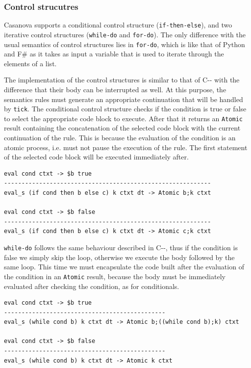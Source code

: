 \subsubsection{Control strucutres}
Casanova supports a conditional control structure (\texttt{if-then-else}), and two iterative control structures (\texttt{while-do} and \texttt{for-do}). The only difference with the usual semantics of control structures lies in \texttt{for-do}, which is like that of Python and F\# as it takes as input a variable that is used to iterate through the elements of a list.

The implementation of the control structures is similar to that of C-{}- with the difference that their body can be interrupted as well. At this purpose, the semantics rules must generate an appropriate continuation that will be handled by \texttt{tick}. The conditional control structure checks if the condition is true or false to select the appropriate code block to execute. After that it returns an \texttt{Atomic} result containing the concatenation of the selected code block with the current continuation of the rule. This is because the evaluation of the condition is an atomic process, i.e. must not pause the execution of the rule. The first statement of the selected code block will be executed immediately after.

\begin{lstlisting}
eval cond ctxt -> $b true
-----------------------------------------------------------
eval_s (if cond then b else c) k ctxt dt -> Atomic b;k ctxt

eval cond ctxt -> $b false
-----------------------------------------------------------
eval_s (if cond then b else c) k ctxt dt -> Atomic c;k ctxt
\end{lstlisting}

\noindent
\texttt{while-do} follows the same behaviour described in C-{}-, thus if the condition is false we simply skip the loop, otherwise we execute the body followed by the same loop. This time we must encapsulate the code built after the evaluation of the condition in an \texttt{Atomic} result, because the body must be immediately evaluated after checking the condition, as for conditionals.

\begin{lstlisting}
eval cond ctxt -> $b true
----------------------------------------------
eval_s (while cond b) k ctxt dt -> Atomic b;((while cond b);k) ctxt

eval cond ctxt -> $b false
----------------------------------------------
eval_s (while cond b) k ctxt dt -> Atomic k ctxt
\end{lstlisting}

